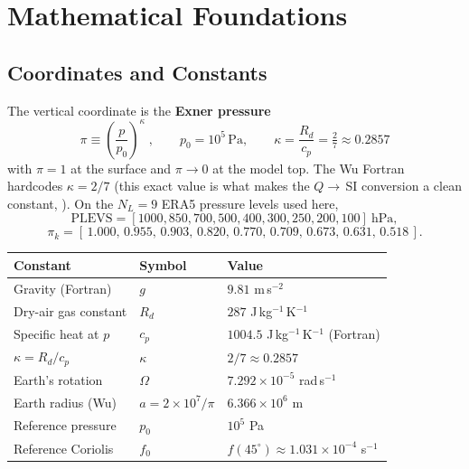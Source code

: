 \chapter{Mathematical Foundations}
\label{chap:math}

\section{Coordinates and Constants}

The vertical coordinate is the \textbf{Exner pressure}
\begin{equation}
\boxed{\;\pi \equiv \left(\frac{p}{p_0}\right)^{\!\kappa}\;,\qquad
       p_0=10^{5}\,\mathrm{Pa},\qquad
       \kappa=\frac{R_d}{c_p}=\tfrac{2}{7}\approx 0.2857\;}
\label{eq:exner}
\end{equation}
with $\pi=1$ at the surface and $\pi\to 0$ at the model top.  The Wu
Fortran hardcodes $\kappa=2/7$ (this exact value is what makes the
$Q\to$\,SI conversion a clean constant, ).  On the
$N_L=9$ ERA5 pressure levels used here,
\begin{equation}
\mathrm{PLEVS}=[1000,850,700,500,400,300,250,200,100]\ \mathrm{hPa},
\end{equation}
\begin{equation}
\pi_k = [\,1.000,\,0.955,\,0.903,\,0.820,\,0.770,\,0.709,\,0.673,\,0.631,\,0.518\,].
\end{equation}

\begin{center}\small
\begin{tabular}{lll}
  \toprule
  Constant & Symbol & Value \\
  \midrule
  Gravity (Fortran)      & $g$        & $9.81$ m\,s$^{-2}$ \\
  Dry-air gas constant   & $R_d$      & $287$ J\,kg$^{-1}$\,K$^{-1}$ \\
  Specific heat at $p$   & $c_p$      & $1004.5$ J\,kg$^{-1}$\,K$^{-1}$ (Fortran)\\
  $\kappa=R_d/c_p$       & $\kappa$   & $2/7 \approx 0.2857$ \\
  Earth's rotation       & $\Omega$   & $7.292\times10^{-5}$ rad\,s$^{-1}$ \\
  Earth radius (Wu)      & $a=2{\times}10^{7}/\pi$ & $6.366\times10^{6}$ m  \\
  Reference pressure     & $p_0$      & $10^{5}$ Pa \\
  Reference Coriolis     & $f_0$      & $f(45^\circ)\approx 1.031\times10^{-4}$ s$^{-1}$ \\
  \bottomrule
\end{tabular}
\end{center}

